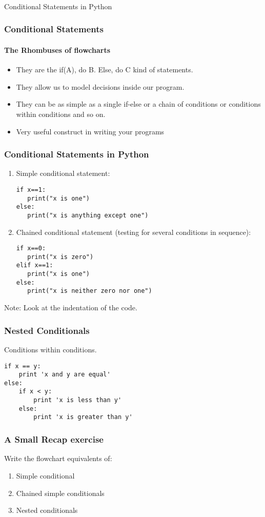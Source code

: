 \documentclass{beamer}
\begin{document}
\begin{frame}
\frametitle{}
\centering
\Large Conditional Statements in Python
\end{frame}

\begin{frame}%
\frametitle{Conditional Statements}
\framesubtitle{The Rhombuses of flowcharts}
\begin{itemize}
\item They are the if(A), do B. Else, do C kind of statements. 
\item They allow us to model decisions inside our program. 
\item They can be as simple as a single if-else or a chain of conditions or conditions within conditions and so on.
\item Very useful construct in writing your programs
\end{itemize}
\end{frame}

\begin{frame}[fragile]%
\frametitle{Conditional Statements in Python}
\begin{enumerate}
\item Simple conditional statement: 
\\ \begin{verbatim}
if x==1:
   print("x is one")
else:
   print("x is anything except one")
\end{verbatim}
\item Chained conditional statement (testing for several conditions in sequence):
\\ \begin{verbatim}
if x==0:
   print("x is zero")
elif x==1:
   print("x is one")
else:
   print("x is neither zero nor one")
\end{verbatim}
\end{enumerate}
Note: Look at the indentation of the code.
\end{frame}


\begin{frame}[fragile]
\frametitle{Nested Conditionals}
Conditions within conditions.
\begin{verbatim}
if x == y:
    print 'x and y are equal'
else:
    if x < y:
        print 'x is less than y'
    else:
        print 'x is greater than y'
\end{verbatim}
\end{frame}

\begin{frame}
\frametitle{A Small Recap exercise}
Write the flowchart equivalents of:
\begin{enumerate}
\item Simple conditional 
\item Chained simple conditionals
\item Nested conditionals
\end{enumerate}
\end{frame}
\end{document}
